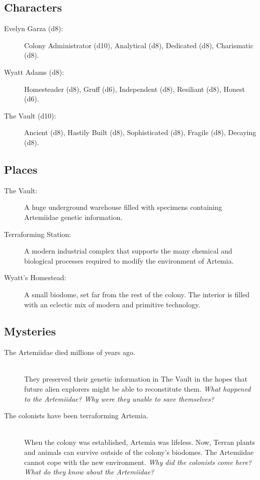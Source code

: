 \documentclass[11pt, a5paper, parskip=half-, DIV=12]{scrartcl}
\begin{document}
\newpage

\subsection*{Characters}
\begin{description}
	\item[Evelyn Garza (d8):] Colony Administrator (d10), Analytical (d8), Dedicated (d8), Charismatic (d8).
	\item[Wyatt Adams (d8):] Homesteader (d8), Gruff (d6), Independent (d8), Resiliant (d8), Honest (d6).
	\item[The Vault (d10):] Ancient (d8), Hastily Built (d8),  Sophisticated (d8), Fragile (d8), Decaying (d8).
\end{description}

\subsection*{Places}
\begin{description}
	\item[The Vault:] A huge underground warehouse filled with specimens containing Artemiidae genetic information.
	\item[Terraforming Station:] A modern industrial complex that supports the many chemical and biological processes required to modify the environment of Artemia.
	\item[Wyatt's Homestead:] A small biodome, set far from the rest of the colony. The interior is filled with an eclectic mix of modern and primitive technology.
\end{description}

\subsection*{Mysteries}
\begin{description}
	\item[The Artemiidae died millions of years ago.] \phantom{a} \\ They preserved their genetic information in The Vault in the hopes that future alien explorers might be able to reconstitute them. \textit{What happened to the Artemiidae? Why were they unable to save themselves?}
	\item[The colonists have been terraforming Artemia.] \phantom{a} \\ When the colony was established, Artemia was lifeless. Now, Terran plants and animals can survive outside of the colony's biodomes. The Artemiidae cannot cope with the new environment. \textit{Why did the colonists come here? What do they know about the Artemiidae?}
\end{description}
\end{document}
